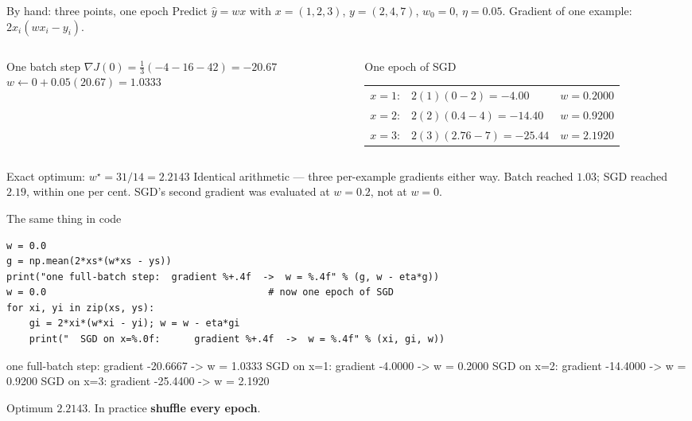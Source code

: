 \documentclass[aspectratio=169]{beamer}
\begin{document}
\begin{frame}[shrink=10]{By hand: three points, one epoch}
  Predict $\hat y = wx$ with $x = (1,2,3)$, $y = (2,4,7)$, $w_0 = 0$,
  $\eta = 0.05$. Gradient of one example: $2x_i(wx_i - y_i)$.
  \begin{columns}[T]
    \begin{column}{0.42\textwidth}
      \begin{block}{One batch step}
        $\nabla J(0) = \frac{1}{3}(-4 -16 -42) = -20.67$\\[0.3em]
        $w \leftarrow 0 + 0.05(20.67) = \mathbf{1.0333}$
      \end{block}
    \end{column}
    \begin{column}{0.54\textwidth}
      \begin{block}{One epoch of SGD}
        \small
        \begin{tabular}{@{}llr@{}}
          $x=1$: & $2(1)(0-2) = -4.00$      & $w = 0.2000$\\
          $x=2$: & $2(2)(0.4-4) = -14.40$   & $w = 0.9200$\\
          $x=3$: & $2(3)(2.76-7) = -25.44$  & $w = \mathbf{2.1920}$\\
        \end{tabular}
      \end{block}
    \end{column}
  \end{columns}
  \vspace{0.3em}
  \begin{alertblock}{Exact optimum: $w^\star = 31/14 = 2.2143$}
    \small Identical arithmetic --- three per-example gradients either way.
    Batch reached $1.03$; SGD reached $2.19$, within one per cent. SGD's second
    gradient was evaluated at $w=0.2$, not at $w=0$.
  \end{alertblock}
\end{frame}

\begin{frame}[fragile]{The same thing in code}
\begin{lstlisting}
w = 0.0
g = np.mean(2*xs*(w*xs - ys))
print("one full-batch step:  gradient %+.4f  ->  w = %.4f" % (g, w - eta*g))
w = 0.0                                       # now one epoch of SGD
for xi, yi in zip(xs, ys):
    gi = 2*xi*(w*xi - yi); w = w - eta*gi
    print("  SGD on x=%.0f:      gradient %+.4f  ->  w = %.4f" % (xi, gi, w))
\end{lstlisting}
\begin{outblk}
one full-batch step:  gradient -20.6667  ->  w = 1.0333
  SGD on x=1:      gradient -4.0000  ->  w = 0.2000
  SGD on x=2:      gradient -14.4000  ->  w = 0.9200
  SGD on x=3:      gradient -25.4400  ->  w = 2.1920
\end{outblk}
\begin{center}\small
  Optimum $2.2143$. In practice \textbf{shuffle every epoch}.
\end{center}
\end{frame}
\end{document}
